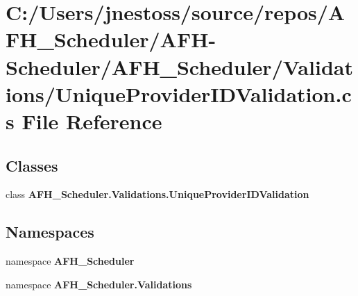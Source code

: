 \section{C\+:/\+Users/jnestoss/source/repos/\+A\+F\+H\+\_\+\+Scheduler/\+A\+F\+H-\/\+Scheduler/\+A\+F\+H\+\_\+\+Scheduler/\+Validations/\+Unique\+Provider\+I\+D\+Validation.cs File Reference}
\label{_unique_provider_i_d_validation_8cs}
\subsection*{Classes}
\begin{DoxyCompactItemize}
\item 
class \textbf{ A\+F\+H\+\_\+\+Scheduler.\+Validations.\+Unique\+Provider\+I\+D\+Validation}
\end{DoxyCompactItemize}
\subsection*{Namespaces}
\begin{DoxyCompactItemize}
\item 
namespace \textbf{ A\+F\+H\+\_\+\+Scheduler}
\item 
namespace \textbf{ A\+F\+H\+\_\+\+Scheduler.\+Validations}
\end{DoxyCompactItemize}
